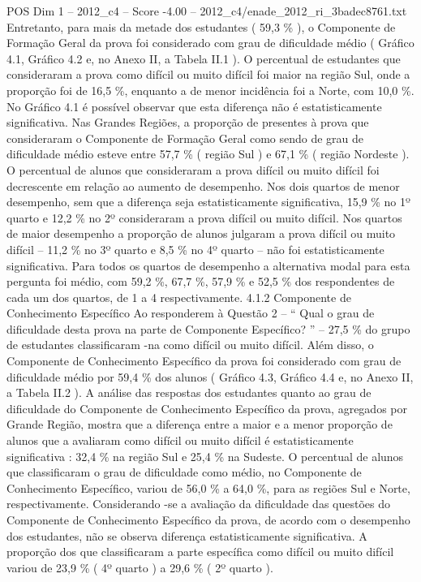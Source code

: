\begin{textsample}{POS Dim 1 – 2012\_c4 – Score -4.00 – 2012\_c4/enade\_2012\_ri\_3badec8761.txt}
Entretanto, para mais da metade dos estudantes ( 59,3 \% ), o Componente de Formação Geral da prova foi considerado com grau de dificuldade médio ( Gráfico 4.1, Gráfico 4.2 e, no Anexo II, a Tabela II.1 ).
O percentual de estudantes que consideraram a prova como difícil ou muito difícil foi maior na região Sul, onde a proporção foi de 16,5 \%, enquanto a de menor incidência foi a Norte, com 10,0 \%.
No Gráfico 4.1 é possível observar que esta diferença não é estatisticamente significativa.
Nas Grandes Regiões, a proporção de presentes à prova que consideraram o Componente de Formação Geral como sendo de grau de dificuldade médio esteve entre 57,7 \% ( região Sul ) e 67,1 \% ( região Nordeste ).
O percentual de alunos que consideraram a prova difícil ou muito difícil foi decrescente em relação ao aumento de desempenho.
Nos dois quartos de menor desempenho, sem que a diferença seja estatisticamente significativa, 15,9 \% no 1º quarto e 12,2 \% no 2º consideraram a prova difícil ou muito difícil.
Nos quartos de maior desempenho a proporção de alunos julgaram a prova difícil ou muito difícil – 11,2 \% no 3º quarto e 8,5 \% no 4º quarto – não foi estatisticamente significativa.
Para todos os quartos de desempenho a alternativa modal para esta pergunta foi médio, com 59,2 \%, 67,7 \%, 57,9 \% e 52,5 \% dos respondentes de cada um dos quartos, de 1 a 4 respectivamente. 4.1.2 Componente de Conhecimento Específico Ao responderem à Questão 2 – “ Qual o grau de dificuldade desta prova na parte de Componente Específico? ” – 27,5 \% do grupo de estudantes classificaram -na como difícil ou muito difícil.
Além disso, o Componente de Conhecimento Específico da prova foi considerado com grau de dificuldade médio por 59,4 \% dos alunos ( Gráfico 4.3, Gráfico 4.4 e, no Anexo II, a Tabela II.2 ).
A análise das respostas dos estudantes quanto ao grau de dificuldade do Componente de Conhecimento Específico da prova, agregados por Grande Região, mostra que a diferença entre a maior e a menor proporção de alunos que a avaliaram como difícil ou muito difícil é estatisticamente significativa : 32,4 \% na região Sul e 25,4 \% na Sudeste.
O percentual de alunos que classificaram o grau de dificuldade como médio, no Componente de Conhecimento Específico, variou de 56,0 \% a 64,0 \%, para as regiões Sul e Norte, respectivamente.
Considerando -se a avaliação da dificuldade das questões do Componente de Conhecimento Específico da prova, de acordo com o desempenho dos estudantes, não se observa diferença estatisticamente significativa.
A proporção dos que classificaram a parte específica como difícil ou muito difícil variou de 23,9 \% ( 4º quarto ) a 29,6 \% ( 2º quarto ).

\end{textsample}
